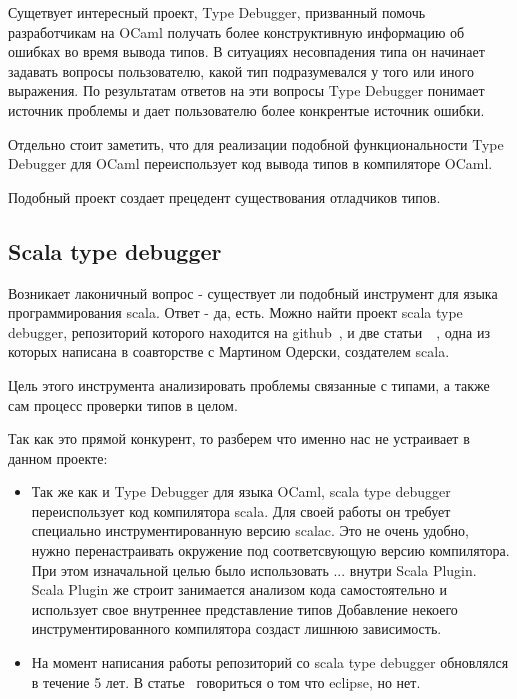 Сущетвует интересный проект, Type Debugger, призванный помочь разработчикам
на OCaml получать более конструктивную информацию об ошибках во время вывода типов.
В ситуациях несовпадения типа он начинает задавать
вопросы пользователю, какой тип подразумевался у того или иного выражения.
По результатам ответов на эти вопросы Type Debugger понимает источник проблемы
и дает пользователю более конкрентые источник ошибки.

Отдельно стоит заметить, что для реализации подобной функциональности
Type Debugger для OCaml переиспользует код вывода типов в компиляторе OCaml.

Подобный проект создает прецедент существования отладчиков типов.

\subsection{Scala type debugger}
\label{sec:typeDebugger}

Возникает лаконичный вопрос - существует ли подобный инструмент для языка
программирования scala.
Ответ - да, есть.
Можно найти проект scala type debugger, репозиторий которого находится на
github~\cite{type_debugger_github}, и две
статьи~\cite{type_debugger1}~\cite{type_debugger2}, одна из которых
написана в соавторстве с Мартином Одерски, создателем scala.

Цель этого инструмента анализировать проблемы связанные с типами, а также сам
процесс проверки типов в целом.

Так как это прямой конкурент, то разберем что именно нас не устраивает в данном
проекте:
\begin{itemize}
  \item Так же как и Type Debugger для языка OCaml, scala type debugger
  переиспользует код компилятора scala.
  Для своей работы он требует специально инструментированную версию scalac.
  Это не очень удобно, нужно перенастраивать окружение под соответсвующую версию
  компилятора.
  При этом изначальной целью было использовать ... внутри Scala Plugin.
  Scala Plugin же строит занимается анализом кода самостоятельно и использует
  свое внутреннее представление типов
  Добавление некоего инструментированного компилятора создаст лишнюю зависимость.
  \item На момент написания работы репозиторий со scala type debugger
  обновлялся в течение 5 лет.
  В статье~\cite{type_debugger1} говориться о том что eclipse, но нет.
\end{itemize}

